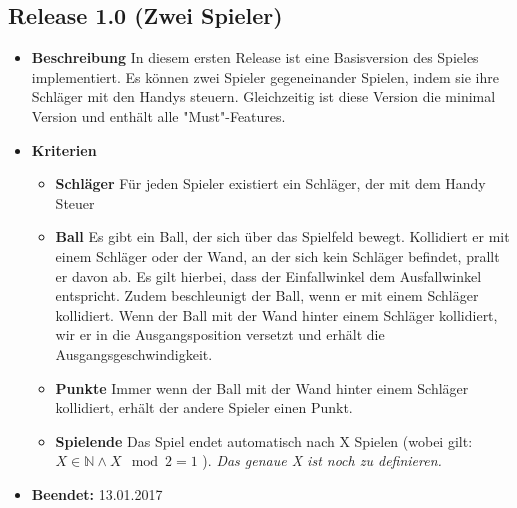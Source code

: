 \subsection{Release 1.0 (Zwei Spieler)}
\begin{itemize}
	\item \textbf{Beschreibung}\newline
	In diesem ersten Release ist eine Basisversion des Spieles implementiert. Es können zwei Spieler gegeneinander Spielen, indem sie ihre Schläger mit den Handys steuern. Gleichzeitig ist diese Version die minimal Version und enthält alle "Must"-Features.
	\item \textbf{Kriterien}
	\begin{itemize}
		\item \textbf{Schläger} \newline
		Für jeden Spieler existiert ein Schläger, der mit dem Handy Steuer
		\item \textbf{Ball} \newline
		Es gibt ein Ball, der sich über das Spielfeld bewegt. Kollidiert er mit einem Schläger oder der Wand, an der sich kein Schläger befindet, prallt er davon ab. Es gilt hierbei, dass der Einfallwinkel dem Ausfallwinkel entspricht. Zudem beschleunigt der Ball, wenn er mit einem Schläger kollidiert. Wenn der Ball mit der Wand hinter einem Schläger kollidiert, wir er in die Ausgangsposition versetzt und erhält die Ausgangsgeschwindigkeit.
		\item \textbf{Punkte} \newline
		Immer wenn der Ball mit der Wand hinter einem Schläger kollidiert, erhält der andere Spieler einen Punkt.
		\item \textbf{Spielende} \newline
		Das Spiel endet automatisch nach X Spielen (wobei gilt: $X \in  \mathbb{N} \land X \mod 2 = 1$ ). \textit{Das genaue X ist noch zu definieren.}
	\end{itemize}
	\item \textbf{Beendet:} 13.01.2017
\end{itemize}

